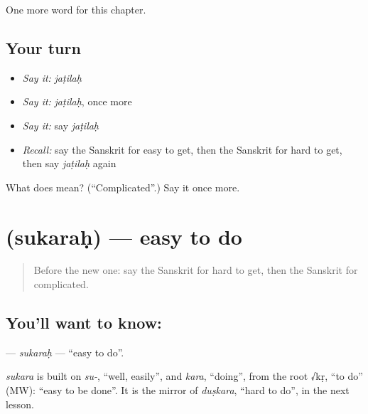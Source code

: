 \begin{grammarlens}[title={What you've built}]
One more word for this chapter.
\end{grammarlens}

\subsection*{Your turn}
\begin{itemize}
\raggedright
  \item \emph{Say it:} \emph{jaṭilaḥ}
  \item \emph{Say it:} \emph{jaṭilaḥ}, once more
  \item \emph{Say it:} say \emph{jaṭilaḥ}
  \item \emph{Recall:} say the Sanskrit for easy to get, then the Sanskrit for hard to get, then say \emph{jaṭilaḥ} again
\end{itemize}

\begin{tcolorbox}[breakable,colback=teal!4,colframe=teal!35!black,title={Before you move on}]
What does  mean? (\textquotedblleft{}Complicated\textquotedblright{}.) Say it once more.
\end{tcolorbox}
\section[\texorpdfstring{\sk{सुकरः} (sukaraḥ)}{सुकरः (sukaraḥ)}]{ (sukaraḥ) — easy to do}

\label{lesson:SA-C242-sukarah}



\begin{quote}
Before the new one: say the Sanskrit for hard to get, then the Sanskrit for complicated.
\end{quote}

\subsection*{You'll want to know: }
\textbf{} — \emph{sukaraḥ} — \textquotedblleft{}easy to do\textquotedblright{}.

\begin{cousinweb}
\emph{sukara} is built on \emph{su-}, \textquotedblleft{}well, easily\textquotedblright{}, and \emph{kara}, \textquotedblleft{}doing\textquotedblright{}, from the root √kṛ, \textquotedblleft{}to do\textquotedblright{} (MW): \textquotedblleft{}easy to be done\textquotedblright{}. It is the mirror of \emph{duṣkara}, \textquotedblleft{}hard to do\textquotedblright{}, in the next lesson.
\end{cousinweb}

